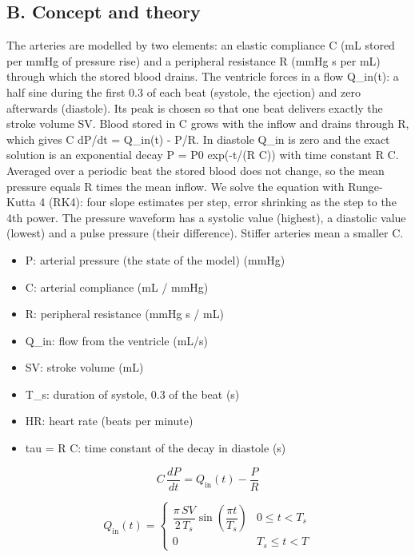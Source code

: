 \documentclass[11pt,a4paper]{article}
\begin{document}
\subsection*{B. Concept and theory}
The arteries are modelled by two elements: an elastic compliance C (mL stored per mmHg of pressure rise) and a peripheral resistance R (mmHg s per mL) through which the stored blood drains. The ventricle forces in a flow Q\_in(t): a half sine during the first 0.3 of each beat (systole, the ejection) and zero afterwards (diastole). Its peak is chosen so that one beat delivers exactly the stroke volume SV. Blood stored in C grows with the inflow and drains through R, which gives C dP/dt = Q\_in(t) - P/R. In diastole Q\_in is zero and the exact solution is an exponential decay P = P0 exp(-t/(R C)) with time constant R C. Averaged over a periodic beat the stored blood does not change, so the mean pressure equals R times the mean inflow. We solve the equation with Runge-Kutta 4 (RK4): four slope estimates per step, error shrinking as the step to the 4th power. The pressure waveform has a systolic value (highest), a diastolic value (lowest) and a pulse pressure (their difference). Stiffer arteries mean a smaller C.

\begin{itemize}[nosep]
\item P: arterial pressure (the state of the model) (mmHg)
\item C: arterial compliance (mL / mmHg)
\item R: peripheral resistance (mmHg s / mL)
\item Q\_in: flow from the ventricle (mL/s)
\item SV: stroke volume (mL)
\item T\_s: duration of systole, 0.3 of the beat (s)
\item HR: heart rate (beats per minute)
\item tau = R C: time constant of the decay in diastole (s)
\end{itemize}

\begin{equation*}
C\,\frac{dP}{dt}=Q_{\mathrm{in}}(t)-\frac{P}{R}
\end{equation*}

\begin{equation*}
Q_{\mathrm{in}}(t)=\begin{cases}\dfrac{\pi\,SV}{2\,T_s}\sin\!\left(\dfrac{\pi t}{T_s}\right)&0\le t<T_s\\[2mm] 0&T_s\le t<T\end{cases}
\end{equation*}
\end{document}
